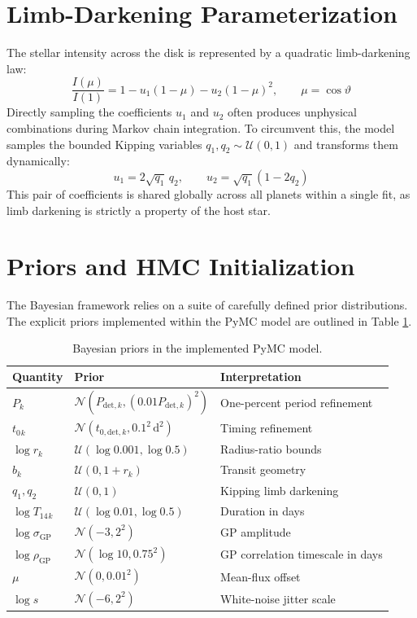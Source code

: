 \documentclass[12pt,a4paper,oneside]{report}
\newcommand{\Porb}{\ensuremath{P}}
\newcommand{\Tfourteen}{\ensuremath{T_{14}}}
\newcommand{\tzero}{\ensuremath{t_{0}}}
\begin{document}
\section{Limb-Darkening Parameterization}
The stellar intensity across the disk is represented by a quadratic limb-darkening law:
\begin{equation}
  \frac{I(\mu)}{I(1)} = 1 - u_1(1-\mu) - u_2(1-\mu)^2, \qquad \mu = \cos\vartheta
\end{equation}
Directly sampling the coefficients \(u_1\) and \(u_2\) often produces unphysical combinations during Markov chain integration. To circumvent this, the model samples the bounded Kipping variables \(q_1, q_2 \sim \mathcal{U}(0,1)\) \cite{kipping2013} and transforms them dynamically:
\begin{equation}
  u_1 = 2\sqrt{q_1}\,q_2, \qquad u_2 = \sqrt{q_1}(1-2q_2)
\end{equation}
This pair of coefficients is shared globally across all planets within a single fit, as limb darkening is strictly a property of the host star.

\section{Priors and HMC Initialization}
The Bayesian framework relies on a suite of carefully defined prior distributions. The explicit priors implemented within the PyMC model are outlined in Table \ref{tab:priors}.

\begin{longtable}{p{}p{}p{}}
\caption{Bayesian priors in the implemented PyMC model.}\label{tab:priors}\\
\toprule
Quantity & Prior & Interpretation\\
\midrule
\(\Porb{}_{k}\) & \(\mathcal{N}(P_{\mathrm{det},k},(0.01P_{\mathrm{det},k})^2)\) & One-percent period refinement\\
\(\tzero{}_{k}\) & \(\mathcal{N}(t_{0,\mathrm{det},k},0.1^2\,\mathrm{d}^2)\) & Timing refinement\\
\(\log r_k\) & \(\mathcal{U}(\log0.001,\log0.5)\) & Radius-ratio bounds\\
\(b_k\) & \(\mathcal{U}(0,1+r_k)\) & Transit geometry\\
\(q_1,q_2\) & \(\mathcal{U}(0,1)\) & Kipping limb darkening\\
\(\log\Tfourteen{}_{k}\) & \(\mathcal{U}(\log0.01,\log0.5)\) & Duration in days\\
\(\log\sigma_{\mathrm{GP}}\) & \(\mathcal{N}(-3,2^2)\) & GP amplitude\\
\(\log\rho_{\mathrm{GP}}\) & \(\mathcal{N}(\log10,0.75^2)\) & GP correlation timescale in days\\
\(\mu\) & \(\mathcal{N}(0,0.01^2)\) & Mean-flux offset\\
\(\log s\) & \(\mathcal{N}(-6,2^2)\) & White-noise jitter scale\\
\bottomrule
\end{longtable}
\end{document}
